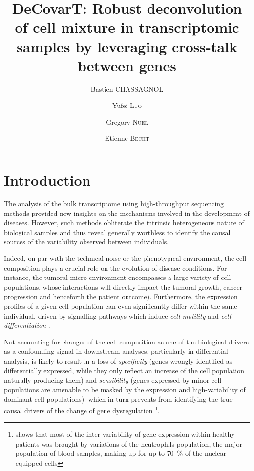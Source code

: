 \documentclass[long, final]{jobim}
\title{DeCovarT: Robust deconvolution of cell mixture in transcriptomic samples by leveraging cross-talk between genes}
\author{Bastien \textsc{CHASSAGNOL}\inst{1, 2}  \and Yufei \textsc{Luo}\inst{1} \and Gregory \textsc{Nuel}\inst{2} \and Etienne \textsc{Becht}\inst{1}}
\institute{
 Les Laboratoires Servier, 50 Rue Carnot, 92150, Suresnes, France
 \and
 LPSM (Laboratoire de Probabilités, Statistiques et Modélisation),  4 place Jussieu, 75005, Paris, France
}
\begin{document}

\maketitle

 \section{Introduction}
 \label{sec:introduction}

The analysis of the bulk transcriptome using high-throughput sequencing methods provided new insights on the mechanisms involved in the development of diseases. However, such methods obliterate the intrinsic heterogeneous nature of biological samples and thus reveal generally worthless to identify the causal sources of the variability observed between individuals.

Indeed, on par with the technical noise or the phenotypical environment, the cell composition plays a crucial role on the evolution of disease conditions. For instance, the tumoral micro environment encompasses a large variety of cell populations, whose interactions will directly impact the tumoral growth, cancer progression and henceforth the patient outcome). Furthermore, the expression profiles of a given cell population can even significantly differ within the same individual, driven by signalling pathways which induce \textit{cell motility} and \textit{cell differentiation} \cite{shoemaker_etal12}.

Not accounting for changes of the cell composition as one of the biological drivers as a confounding signal in downstream analyses, particularly in differential analysis, is likely to result in a loss of \textit{specificity} (genes wrongly identified as differentially expressed, while they only reflect an increase of the cell population naturally producing them) and \textit{sensibility} (genes expressed by minor cell populations are amenable to be masked by the expression and high-variability of dominant cell populations), which in turn prevents from identifying the true causal drivers of the change of gene dysregulation \footnote{\cite{whitney_etal03} shows that most of the inter-variability of gene expression within healthy patients was brought by variations of the neutrophils population, the major population of blood samples, making up for up to \qty{70}{\percent} of the nuclear-equipped cells}.
\end{document}
